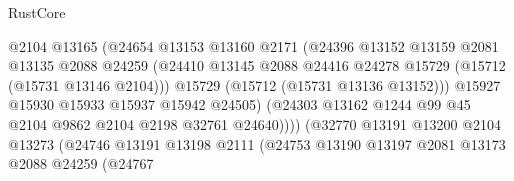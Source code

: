 \begin{lexlean}{RustCore}
\begin{coremodule}
                                      @2104
                                      @13165
                                      (@24654
                                        @13153
                                        @13160
                                        @2171
                                        (@24396
                                          @13152
                                          @13159
                                          @2081
                                          @13135
                                          @2088
                                          @24259
                                          (@24410
                                            @13145
                                            @2088
                                            @24416
                                            @24278
                                            @15729
                                            (@15712 (@15731 @13146 @2104)))
                                          @15729
                                          (@15712 (@15731 @13136 @13152)))
                                        @15927
                                        @15930
                                        @15933
                                        @15937
                                        @15942
                                        @24505)
                                      (@24303
                                        @13162
                                        @1244
                                        @99
                                        @45
                                        @2104
                                        @9862
                                        @2104
                                        @2198
                                        @32761
                                        @24640))))
                                (@32770
                                  @13191
                                  @13200
                                  @2104
                                  @13273
                                  (@24746
                                    @13191
                                    @13198
                                    @2111
                                    (@24753
                                      @13190
                                      @13197
                                      @2081
                                      @13173
                                      @2088
                                      @24259
                                      (@24767

\end{coremodule}
\end{lexlean}
